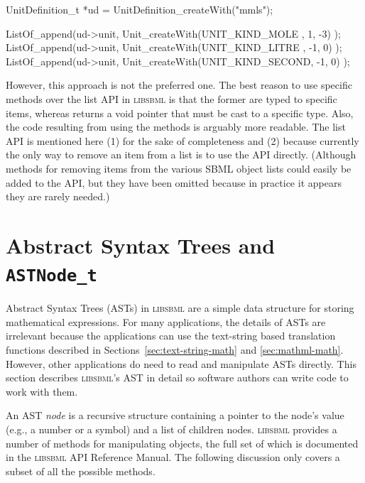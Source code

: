 \documentclass{sbmlmanual}
\newcommand{\libsbml}{\textsc{libsbml}}
\begin{document}
\begin{example}[c]
UnitDefinition_t *ud = UnitDefinition_createWith("mmls");

ListOf_append(ud->unit, Unit_createWith(UNIT_KIND_MOLE  ,  1, -3) );
ListOf_append(ud->unit, Unit_createWith(UNIT_KIND_LITRE , -1,  0) );
ListOf_append(ud->unit, Unit_createWith(UNIT_KIND_SECOND, -1,  0) );
\end{example}


However, this approach is not the preferred one.  The best reason to use
specific  methods over the list API in \libsbml{} is
that the former are typed to specific items, whereas 
returns a void pointer that must be cast to a specific type.  Also, the
code resulting from using the  methods is arguably
more readable.  The list API is mentioned here (1) for the sake of
completeness and (2) because currently the only way to remove an item from
a list is to use the API directly.  (Although methods for removing items
from the various SBML object lists could easily be added to the API, but
they have been omitted because in practice it appears they are rarely
needed.)


\section{Abstract Syntax Trees and \texttt{ASTNode\_t}}
\label{app:ast}

Abstract Syntax Trees (ASTs) in \libsbml{} are a simple data structure for
storing mathematical expressions.  For many applications, the details of
ASTs are irrelevant because the applications can use the text-string based
translation functions described in Sections~\ref{sec:text-string-math} and
\ref{sec:mathml-math}.  However, other applications do need to read and
manipulate ASTs directly.  This section describes \libsbml{}'s AST in
detail so software authors can write code to work with them.

An AST \emph{node} is a recursive structure containing a pointer to the
node's value (e.g., a number or a symbol) and a list of children nodes.
\libsbml{} provides a number of methods for manipulating 
objects, the full set of which is documented in the \libsbml{} API
Reference Manual.   The following discussion only covers a subset of all
the possible methods.
\end{document}
